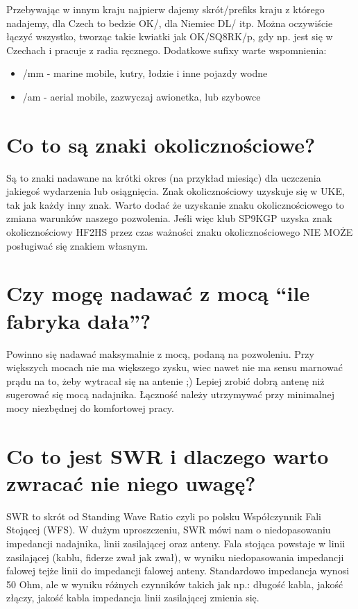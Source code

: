 \documentclass[a4paper,12pt]{article}
\begin{document}
Przebywając w innym kraju najpierw dajemy skrót/prefiks kraju z którego nadajemy, dla Czech to bedzie OK/, dla Niemiec DL/ itp. Można oczywiście łączyć wszystko, tworząc takie kwiatki jak OK/SQ8RK/p, gdy np. jest się w Czechach i pracuje z radia ręcznego.
Dodatkowe sufixy warte wspomnienia:
\begin{itemize}
\item /mm - marine mobile, kutry, łodzie i inne pojazdy wodne
\item /am - aerial mobile, zazwyczaj awionetka, lub szybowce\end{itemize}

\section{Co to są znaki okolicznościowe?}
Są to znaki nadawane na krótki okres (na przykład miesiąc) dla uczczenia jakiegoś wydarzenia lub osiągnięcia.
Znak okolicznościowy uzyskuje się w UKE, tak jak każdy inny znak. 
Warto dodać że uzyskanie znaku okolicznościowego to zmiana warunków naszego pozwolenia. Jeśli więc klub SP9KGP uzyska znak okolicznościowy HF2HS przez czas ważności znaku okolicznościowego NIE MOŻE posługiwać się znakiem własnym.

\section{Czy mogę nadawać z mocą ``ile fabryka dała''?}
Powinno się nadawać maksymalnie z mocą, podaną na pozwoleniu. Przy większych mocach nie ma większego zysku, wiec nawet nie ma sensu marnować prądu na to, żeby wytracał się na antenie ;) Lepiej zrobić dobrą antenę niż sugerować się mocą nadajnika.
Łączność należy utrzymywać przy minimalnej mocy niezbędnej do komfortowej pracy. 

\section{Co to jest SWR i dlaczego warto zwracać nie niego uwagę?}
SWR to skrót od Standing Wave Ratio czyli po polsku Współczynnik Fali Stojącej (WFS). W dużym uproszczeniu, SWR mówi nam o niedopasowaniu impedancji nadajnika, linii zasilającej oraz anteny. Fala stojąca powstaje w linii zasilającej (kablu, fiderze zwał jak zwał), w wyniku niedopasowania impedancji falowej tejże linii do impedancji falowej anteny. Standardowo impedancja wynosi 50 Ohm, ale w wyniku różnych czynników takich jak np.: długość kabla, jakość złączy, jakość kabla impedancja linii zasilającej zmienia się. 
\end{document}
